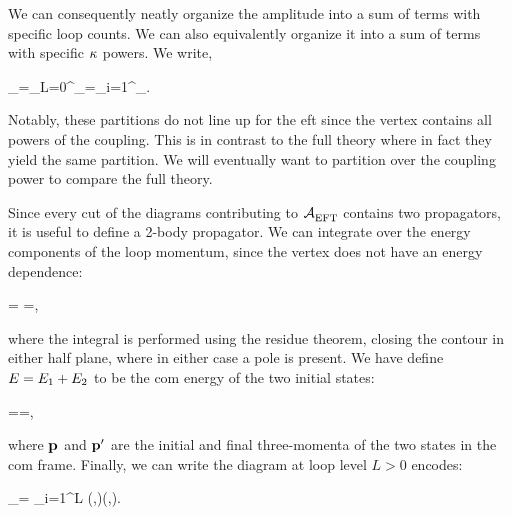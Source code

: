 \documentclass[
  11pt,
  a4paper,
  DIV=11,
  numbers=noendperiod,
  oneside]{scrreprt}
\let\[\relax \let\]\relax %
\DeclareRobustCommand{\[}{\begin{equation}}
\DeclareRobustCommand{\]}{\end{equation}}
\begin{document}
We can consequently neatly organize the amplitude into a sum of terms
with specific loop counts. We can also equivalently organize it into a
sum of terms with specific \(\coupling\) powers. We write,

\[\ampl_=\sum\limits_{L=0}^\infty{}_=\sum\limits_{i=1}^\infty \ampl[(i)]_.\]

Notably, these partitions do not line up for the \gls{eft} since the
vertex contains all powers of the coupling. This is in contrast to the
full theory where in fact they yield the same partition. We will
eventually want to partition over the coupling power to compare the full
theory.

Since every cut of the diagrams contributing to \(\ampl_\text{EFT}\)
contains two propagators, it is useful to define a 2-body propagator. We
can integrate over the energy components of the loop momentum, since the
vertex does not have an energy dependence:

\[\im {}=\int \dn{\omega} =,\]

where the integral is performed using the residue theorem, closing the
contour in either half plane, where in either case a pole is present. We
have define \(\energy=\energy[1]+\energy[2]\) to be the \gls{com} energy
of the two initial states:

\[
\energy[i]==,
\]

where \(\tv{p}\) and \(\tv{p'}\) are the initial and final three-momenta
of the two states  in
the \gls{com} frame. Finally, we can write the diagram at loop level
\(L>0\) encodes:

\[ 
_= \int\prod\limits_{i=1}^L   \pot(,)\cdots{}\pot(,).
\]
\end{document}
